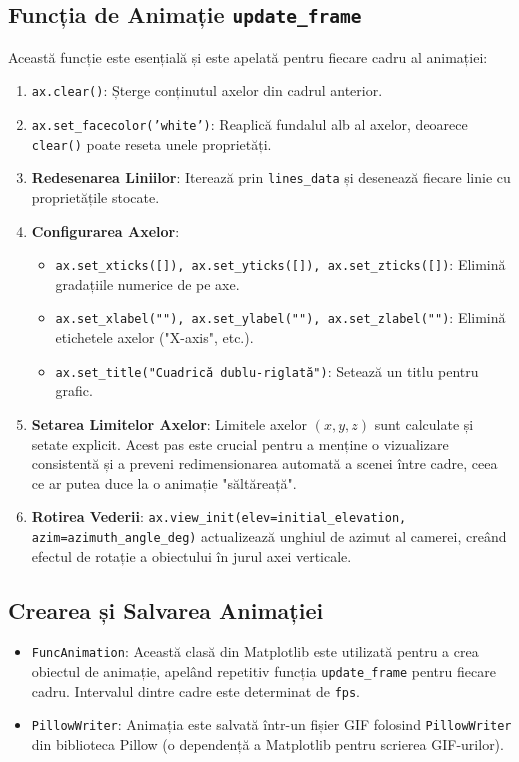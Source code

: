\documentclass[a4paper,11pt]{article}
\begin{document}
\subsection{Funcția de Animație \texttt{update\_frame}}
Această funcție este esențială și este apelată pentru fiecare cadru al animației:
\begin{enumerate}
    \item \texttt{ax.clear()}: Șterge conținutul axelor din cadrul anterior.
    \item \texttt{ax.set\_facecolor('white')}: Reaplică fundalul alb al axelor, deoarece \texttt{clear()} poate reseta unele proprietăți.
    \item \textbf{Redesenarea Liniilor}: Iterează prin \texttt{lines\_data} și desenează fiecare linie cu proprietățile stocate.
    \item \textbf{Configurarea Axelor}: 
        \begin{itemize}
            \item \texttt{ax.set\_xticks([]), ax.set\_yticks([]), ax.set\_zticks([])}: Elimină gradațiile numerice de pe axe.
            \item \texttt{ax.set\_xlabel(""), ax.set\_ylabel(""), ax.set\_zlabel("")}: Elimină etichetele axelor ("X-axis", etc.).
            \item \texttt{ax.set\_title("Cuadrică dublu-riglată")}: Setează un titlu pentru grafic.
        \end{itemize}
    \item \textbf{Setarea Limitelor Axelor}: Limitele axelor $(x, y, z)$ sunt calculate și setate explicit. Acest pas este crucial pentru a menține o vizualizare consistentă și a preveni redimensionarea automată a scenei între cadre, ceea ce ar putea duce la o animație "săltăreață".
    \item \textbf{Rotirea Vederii}: \texttt{ax.view\_init(elev=initial\_elevation, azim=azimuth\_angle\_deg)} actualizează unghiul de azimut al camerei, creând efectul de rotație a obiectului în jurul axei verticale.
\end{enumerate}

\subsection{Crearea și Salvarea Animației}
\begin{itemize}
    \item \texttt{FuncAnimation}: Această clasă din Matplotlib este utilizată pentru a crea obiectul de animație, apelând repetitiv funcția \texttt{update\_frame} pentru fiecare cadru. Intervalul dintre cadre este determinat de \texttt{fps}.
    \item \texttt{PillowWriter}: Animația este salvată într-un fișier GIF folosind \texttt{PillowWriter} din biblioteca Pillow (o dependență a Matplotlib pentru scrierea GIF-urilor).
\end{itemize}
\end{document}
